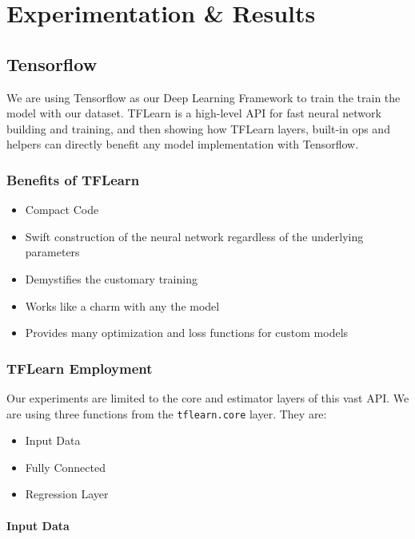 \chapter{Experimentation \& Results}

\pagebreak

\section{Tensorflow}

We are using Tensorflow as our Deep Learning Framework to train the train the model with our dataset. TFLearn is a high-level API for fast neural network building and training, and then showing how TFLearn layers, built-in ops and helpers can directly benefit any model implementation with Tensorflow. 

\subsection{Benefits of TFLearn}
\begin{itemize}
    \item Compact Code
    \item Swift construction of the neural network regardless of the underlying parameters 
    \item Demystifies the customary training
    \item Works like a charm with any the model
    \item Provides many optimization and loss functions for custom models
\end{itemize}

\pagebreak

\subsection{TFLearn Employment}

Our experiments are limited to the core and estimator layers of this vast API. We are using three functions from the \texttt{tflearn.core} layer. They are:

\begin{itemize}
    \item Input Data
    \item Fully Connected
    \item Regression Layer
\end{itemize}

\subsubsection{Input Data}

